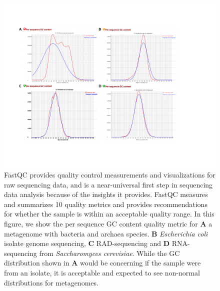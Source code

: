 \documentclass[10pt,letterpaper]{article}
\begin{document}
\begin{figure}[]
    \includegraphics[scale=0.6]{fastqc}
    \caption{FastQC provides quality control measurements and visualizations for raw sequencing data, and is a near-universal first step in sequencing data analysis because of the insights it provides.
FastQC measures and summarizes 10 quality metrics and provides recommendations for whether the sample is within an acceptable quality range. In this figure, we show the per sequence GC content quality metric for \textbf{A} a metagenome with bacteria and archaea species. \textbf{B} \textit{Escherichia coli} isolate genome sequencing, \textbf{C} RAD-sequencing and \textbf{D} RNA-sequencing from \textit{Saccharomyces cerevisiae}. While the GC distribution shown in \textbf{A} would be concerning if the sample were from an isolate, it is acceptable and expected to see non-normal distributions for metagenomes.} 
    \label{fig:fastqc}
\end{figure}
\end{document}
